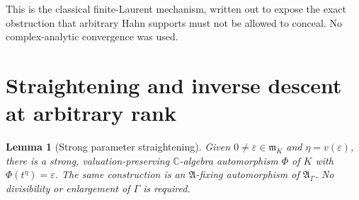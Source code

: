 \documentclass[11pt,a4paper]{article}
\numberwithin{equation}{section}
\newtheorem{lemma}[lemma]{Lemma}
\theoremstyle{definition}
\theoremstyle{remark}
\newcommand{\C}{\mathbb C}
\newcommand{\K}{K}
\newcommand{\mK}{\mathfrak m_K}
\newcommand{\eps}{\varepsilon}
\newcommand{\Alg}{\mathfrak A}
\newcommand{\AlgG}{\mathfrak A_\Gamma}
\begin{document}
This is the classical finite-Laurent mechanism, written out to expose the
exact obstruction that arbitrary Hahn supports must not be allowed to
conceal. No complex-analytic convergence was used.

\section{Straightening and inverse descent at arbitrary rank}\label{ihs:dz:sec:descent}

\begin{lemma}[Strong parameter straightening]\label{ihs:dz:lem:straighten}
Given $0\ne\eps\in\mK$ and $\eta=v(\eps)$, there is a strong,
valuation-preserving $\C$-algebra automorphism $\Phi$ of $\K$ with
$\Phi(t^\eta)=\eps$. The same construction is an $\Alg$-fixing automorphism
of $\AlgG$. No divisibility or enlargement of $\Gamma$ is required.
\end{lemma}
\end{document}
